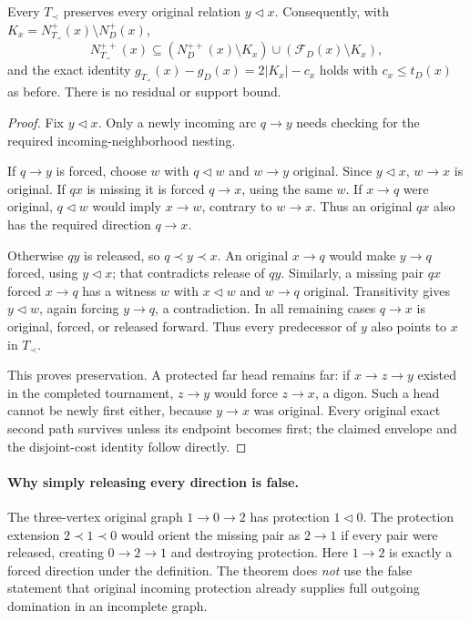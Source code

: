 \begin{theorem}
\label{thm:protection-forced-completion-preserves}
Every $T_\prec$ preserves every original relation $y\triangleleft x$.
Consequently, with $K_x=N_{T_\prec}^+(x)\setminus N_D^+(x)$,
\[
 N_{T_\prec}^{++}(x)\subseteq
 (N_D^{++}(x)\setminus K_x)\cup
 (\mathcal F_D(x)\setminus K_x),
\]
and the exact identity $g_{T_\prec}(x)-g_D(x)=2|K_x|-c_x$ holds
with $c_x\le t_D(x)$ as before. There is no residual or support bound.
\end{theorem}
\begin{proof}
Fix $y\triangleleft x$. Only a newly incoming arc $q\to y$ needs
checking for the required incoming-neighborhood nesting.

If $q\to y$ is forced, choose $w$ with $q\triangleleft w$ and
$w\to y$ original. Since $y\triangleleft x$, $w\to x$ is original.
If $qx$ is missing it is forced $q\to x$, using the same $w$.
If $x\to q$ were original, $q\triangleleft w$ would imply
$x\to w$, contrary to $w\to x$. Thus an original $qx$ also has
the required direction $q\to x$.

Otherwise $qy$ is released, so $q\prec y\prec x$. An original
$x\to q$ would make $y\to q$ forced, using $y\triangleleft x$;
that contradicts release of $qy$. Similarly, a missing pair $qx$
forced $x\to q$ has a witness $w$ with $x\triangleleft w$ and
$w\to q$ original. Transitivity gives $y\triangleleft w$, again
forcing $y\to q$, a contradiction. In all remaining cases $q\to x$
is original, forced, or released forward. Thus every predecessor of
$y$ also points to $x$ in $T_\prec$.

This proves preservation. A protected far head remains far: if
$x\to z\to y$ existed in the completed tournament, $z\to y$
would force $z\to x$, a digon. Such a head cannot be newly first
either, because $y\to x$ was original. Every original exact second
path survives unless its endpoint becomes first; the claimed envelope
and the disjoint-cost identity follow directly.
\end{proof}

\paragraph{Why simply releasing every direction is false.}
The three-vertex original graph $1\to0\to2$ has protection
$1\triangleleft0$. The protection extension $2\prec1\prec0$
would orient the missing pair as $2\to1$ if every pair were released,
creating $0\to2\to1$ and destroying protection. Here $1\to2$ is
exactly a forced direction under the definition. The theorem does
\emph{not} use the false statement that original incoming protection
already supplies full outgoing domination in an incomplete graph.

